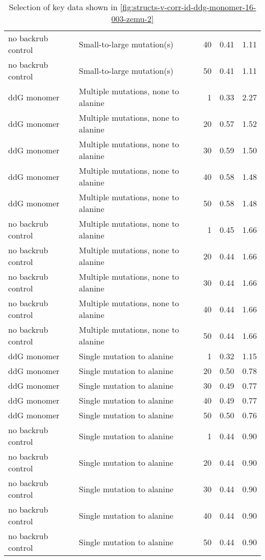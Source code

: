 \begin{table}
\begin{tabular}{llrrr}
 no backrub control &           Small-to-large mutation(s) &          40 & 0.41 & 1.11 \\
 no backrub control &           Small-to-large mutation(s) &          50 & 0.41 & 1.11 \\
        ddG monomer &  Multiple mutations, none to alanine &           1 & 0.33 & 2.27 \\
        ddG monomer &  Multiple mutations, none to alanine &          20 & 0.57 & 1.52 \\
        ddG monomer &  Multiple mutations, none to alanine &          30 & 0.59 & 1.50 \\
        ddG monomer &  Multiple mutations, none to alanine &          40 & 0.58 & 1.48 \\
        ddG monomer &  Multiple mutations, none to alanine &          50 & 0.58 & 1.48 \\
 no backrub control &  Multiple mutations, none to alanine &           1 & 0.45 & 1.66 \\
 no backrub control &  Multiple mutations, none to alanine &          20 & 0.44 & 1.66 \\
 no backrub control &  Multiple mutations, none to alanine &          30 & 0.44 & 1.66 \\
 no backrub control &  Multiple mutations, none to alanine &          40 & 0.44 & 1.66 \\
 no backrub control &  Multiple mutations, none to alanine &          50 & 0.44 & 1.66 \\
        ddG monomer &           Single mutation to alanine &           1 & 0.32 & 1.15 \\
        ddG monomer &           Single mutation to alanine &          20 & 0.50 & 0.78 \\
        ddG monomer &           Single mutation to alanine &          30 & 0.49 & 0.77 \\
        ddG monomer &           Single mutation to alanine &          40 & 0.49 & 0.77 \\
        ddG monomer &           Single mutation to alanine &          50 & 0.50 & 0.76 \\
 no backrub control &           Single mutation to alanine &           1 & 0.44 & 0.90 \\
 no backrub control &           Single mutation to alanine &          20 & 0.44 & 0.90 \\
 no backrub control &           Single mutation to alanine &          30 & 0.44 & 0.90 \\
 no backrub control &           Single mutation to alanine &          40 & 0.44 & 0.90 \\
 no backrub control &           Single mutation to alanine &          50 & 0.44 & 0.90 \\
\bottomrule
\end{tabular}

\caption[]{Selection of key data shown in \cref{fig:structs-v-corr-id-ddg-monomer-16-003-zemu-2}}
\label{tab:structs-v-corr-id-ddg-monomer-16-003-zemu-2-underlying-data}
\end{table}

